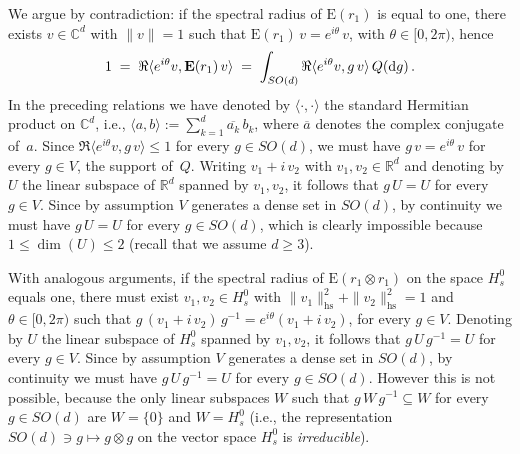 \documentclass[a4paper,reqno,11pt]{amsart}
\numberwithin{equation}{section}
\newcommand{\dd}{\text{\rm d}}             %
\newcommand{\R}{\mathbb{R}}
\newcommand{\C}{\mathbb{C}}
\def\bE{\ensuremath{\bs{\mathrm{E}}}}
\def\bs{\boldsymbol}
\begin{document}
We argue by contradiction: if the spectral radius of $\bE(r_1)$
is equal to one, there exists $v \in \C^d$ with $\|v\| = 1$ such that
$\bE(r_1)\, v = e^{i \theta}\, v$, with $\theta \in [0,2\pi)$, hence
\begin{equation}
	1 \;=\; \Re \langle e^{i\theta} v , \bE(r_1)\, v \rangle \;=\;
	\int_{SO(d)} \Re \langle e^{i\theta} v , g\, v \rangle \, Q(\dd g) \,.
\end{equation}
In the preceding relations we have denoted by $\langle \cdot, \cdot \rangle$
the standard Hermitian product on $\C^d$, i.e.,
$\langle a, b \rangle := \sum_{k=1}^d \overline{a_k} \, b_k$,
where $\overline a$ denotes the complex conjugate of~$a$.
Since $\Re \langle e^{i\theta} v , g\, v \rangle \le 1$ for every $g \in SO(d)$,
we must have $g \, v = e^{i\theta}\, v$ for every $g \in V$, the support of~$Q$.
Writing $v_1 + i\, v_2$ with $v_1, v_2 \in \R^d$ and denoting by $U$ the
linear subspace of $\R^d$ spanned by $v_1, v_2$, it follows that
$g \, U = U$ for every $g \in V$. Since by assumption $V$ generates
a dense set in $SO(d)$, by continuity we must have
$g \, U = U$ for every $g \in SO(d)$, which is clearly impossible
because $1 \le \dim(U) \le 2$ (recall that we assume $d \ge 3$).

With analogous arguments, if the spectral radius of
$\bE(r_1 \otimes r_1)$ on the space $H_s^0$ equals one, there must exist 
$v_1, v_2 \in H^0_s$ with $\| v_1 \|_{\text{hs}}^2 + \| v_2 \|_{\text{hs}}^2 = 1$
and $\theta \in [0,2\pi)$ such that
$g \, (v_1 + i\,v_2) \, g^{-1} = e^{i\theta} (v_1 + i\,v_2)$,
for every $g \in V$. Denoting by $U$ the
linear subspace of $H^0_s$ spanned by $v_1, v_2$, it follows that
$g \, U \, g^{-1} = U$ for every $g \in V$.
Since by assumption $V$ generates
a dense set in $SO(d)$, by continuity we must have
$g \, U \, g^{-1} = U$ for every $g \in SO(d)$.
However this is not possible, because 
the only linear subspaces $W$ such that $g \, W \, g^{-1} \subseteq W$
for every $g \in SO(d)$ are $W=\{0\}$ and $W = H^0_s$
(i.e., the representation $SO(d) \ni g \mapsto g \otimes g$ 
on the vector space $H^0_s$ is {\sl irreducible}).
\end{document}
